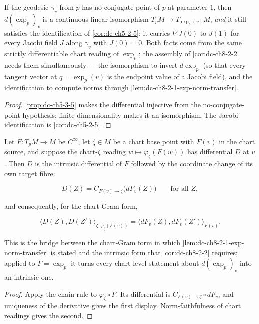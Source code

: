 \begin{lemma}
  \label{lem:dc-ch8-2-1-exp-equiv}


  If the geodesic $\gamma_v$ from $p$ has no conjugate point of $p$ at parameter $1$, then
  $d(\exp_p)_v$ is a continuous linear isomorphism $T_pM\to T_{\exp_p(v)}M$, \emph{and} it still
  satisfies the identification of \cref{cor:dc-ch5-2-5}: it carries $\nabla J(0)$ to $J(1)$ for
  every Jacobi field $J$ along $\gamma_v$ with $J(0)=0$. Both facts come from the same strictly
  differentiable chart reading of $\exp_p$; the assembly of \cref{cor:dc-ch8-2-2} needs them
  simultaneously --- the isomorphism to invert $d\exp_p$ (so that every tangent vector at
  $q=\exp_p(v)$ is the endpoint value of a Jacobi field), and the identification to compute
  norms through \cref{lem:dc-ch8-2-1-exp-norm-transfer}.
\end{lemma}
\begin{proof}

\sketch
  \cref{prop:dc-ch5-3-5} makes the differential injective from the no-conjugate-point
  hypothesis; finite-dimensionality makes it an isomorphism. The Jacobi identification is
  \cref{cor:dc-ch5-2-5}.
\end{proof}

\begin{lemma}
  \label{lem:dc-ch8-2-1-mfderiv-bridge}


  Let $F:T_pM\to M$ be $C^\infty$, let $\zeta\in M$ be a chart base point with $F(v)$ in the
  chart source, and suppose the chart-$\zeta$ reading $w\mapsto\varphi_\zeta(F(w))$ has
  differential $D$ at $v$. Then $D$ is the intrinsic differential of $F$ followed by the
  coordinate change of its own target fibre:

  $$
  D(Z)=C_{F(v)\to\zeta}\big(dF_v(Z)\big)\qquad\text{for all }Z ,
  $$

  and consequently, for the chart Gram form,

  $$
  \langle D(Z),D(Z')\rangle_{\zeta,\varphi_\zeta(F(v))}=\langle dF_v(Z),dF_v(Z')\rangle_{F(v)} .
  $$

  This is the bridge between the chart-Gram form in which \cref{lem:dc-ch8-2-1-exp-norm-transfer}
  is stated and the intrinsic form that \cref{cor:dc-ch8-2-2} requires; applied to $F=\exp_p$ it
  turns every chart-level statement about $d(\exp_p)_v$ into an intrinsic one.
\end{lemma}
\begin{proof}

\sketch
  Apply the chain rule to $\varphi_\zeta\circ F$. Its differential is
  $C_{F(v)\to\zeta}\circ dF_v$, and uniqueness of the derivative gives the first
  display. Norm-faithfulness of chart readings gives the second.
\end{proof}


